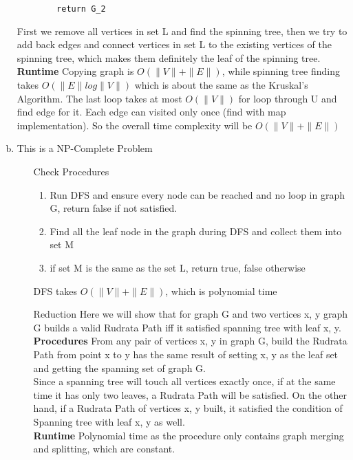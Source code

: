 \documentclass{article}
\def\math#1{$#1$}
\begin{document}
\begin{enumerate}[a)]
\begin{verbatim}
        return G_2
    \end{verbatim}
    First we remove all vertices in set L and find the spinning tree, then we try to add back edges and connect vertices in set L to the existing vertices of the spinning tree, which makes them definitely the leaf of the spinning tree. \\
    \textbf{Runtime}
    Copying graph is \math{O(\|V\| + \|E\|)}, while spinning tree finding takes \math{O(\|E\|log\|V\|)} which is about the same as the Kruskal’s Algorithm. The last loop takes at most \math{O(\|V\|)} for loop through U and find edge for it. Each edge can visited only once (find with map implementation). 
    So the overall time complexity will be \math{O(\|V\| + \|E\|)}
    \item This is a NP-Complete Problem
        \begin{itemize}
            \item [Check Procedures]
                \begin{enumerate}
                    \item Run DFS and ensure every node can be reached and no loop in graph G, return false if not satisfied.
                    \item Find all the leaf node in the graph during DFS and collect them into set M
                    \item if set M is the same as the set L, return true, false otherwise
                \end{enumerate}
                DFS takes \math{O(\|V\|+\|E\|)}, which is polynomial time
            \item [Reduction]
                Here we will show that for graph G and two vertices x, y graph G builds a valid Rudrata Path iff it satisfied spanning tree with leaf x, y. \\
                \textbf{Procedures}
                From any pair of vertices x, y in graph G, build the Rudrata Path from point x to y has the same result of setting x, y as the leaf set and getting the spanning set of graph G. \\
                Since a spanning tree will touch all vertices exactly once, if at the same time it has only two leaves, a Rudrata Path will be satisfied. On the other hand, if a Rudrata Path of vertices x, y built, it satisfied the condition of Spanning tree with leaf x, y as well.\\
                \textbf{Runtime}
                Polynomial time as the procedure only contains graph merging and splitting, which are constant. 

\end{itemize}
\end{enumerate}
\end{document}
